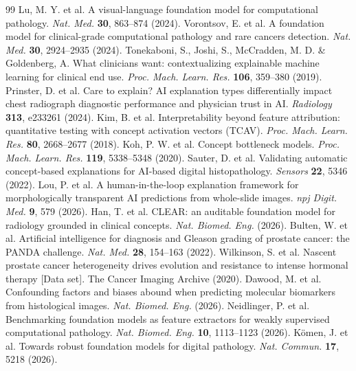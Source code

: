 \begin{thebibliography}{99}
\small
{} Lu, M. Y. et al. A visual-language foundation model for
computational pathology. \textit{Nat. Med.} \textbf{30}, 863--874 (2024).
 Vorontsov, E. et al. A foundation model for clinical-grade
computational pathology and rare cancers detection. \textit{Nat. Med.} \textbf{30},
2924--2935 (2024).
 Tonekaboni, S., Joshi, S., McCradden, M. D. \& Goldenberg,
A. What clinicians want: contextualizing explainable machine learning for clinical end
use. \textit{Proc. Mach. Learn. Res.} \textbf{106}, 359--380 (2019).
 Prinster, D. et al. Care to explain? AI explanation types
differentially impact chest radiograph diagnostic performance and physician trust in AI.
\textit{Radiology} \textbf{313}, e233261 (2024).
 Kim, B. et al. Interpretability beyond feature attribution:
quantitative testing with concept activation vectors (TCAV). \textit{Proc. Mach. Learn.
Res.} \textbf{80}, 2668--2677 (2018).
 Koh, P. W. et al. Concept bottleneck models. \textit{Proc. Mach. Learn.
Res.} \textbf{119}, 5338--5348 (2020).
 Sauter, D. et al. Validating automatic concept-based explanations
for AI-based digital histopathology. \textit{Sensors} \textbf{22}, 5346 (2022).
 Lou, P. et al. A human-in-the-loop explanation framework for
morphologically transparent AI predictions from whole-slide images. \textit{npj Digit.
Med.} \textbf{9}, 579 (2026).
 Han, T. et al. CLEAR: an auditable foundation model for radiology
grounded in clinical concepts. \textit{Nat. Biomed. Eng.} (2026).
 Bulten, W. et al. Artificial intelligence for diagnosis and
Gleason grading of prostate cancer: the PANDA challenge. \textit{Nat. Med.}
\textbf{28}, 154--163 (2022).
 Wilkinson, S. et al. Nascent prostate cancer heterogeneity drives
evolution and resistance to intense hormonal therapy [Data set]. The Cancer Imaging
Archive (2020).
 Dawood, M. et al. Confounding factors and biases abound when
predicting molecular biomarkers from histological images. \textit{Nat. Biomed. Eng.}
(2026).
 Neidlinger, P. et al. Benchmarking foundation models as
feature extractors for weakly supervised computational pathology. \textit{Nat. Biomed.
Eng.} \textbf{10}, 1113--1123 (2026).
 K\"omen, J. et al. Towards robust foundation models for digital
pathology. \textit{Nat. Commun.} \textbf{17}, 5218 (2026).

\end{thebibliography}
